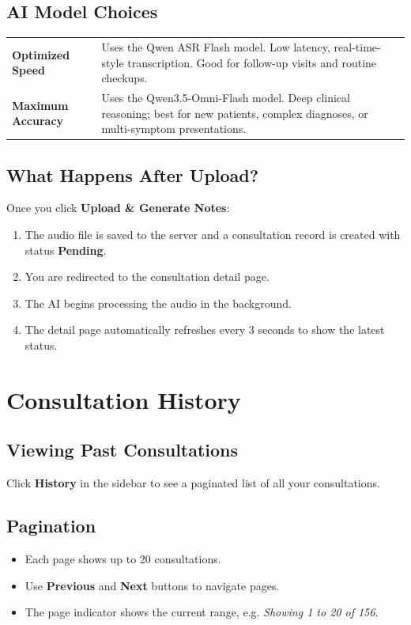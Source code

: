 \documentclass[12pt,a4paper]{article}
\begin{document}
\subsection{AI Model Choices}
\begin{tabular}{m{4cm}m{8cm}}
	\textbf{Optimized Speed}  & Uses the Qwen ASR Flash model. Low latency, real-time-style transcription. Good for follow-up visits and routine checkups.            \\[0.5em]
	\textbf{Maximum Accuracy} & Uses the Qwen3.5-Omni-Flash model. Deep clinical reasoning; best for new patients, complex diagnoses, or multi-symptom presentations. \\
\end{tabular}

\subsection{What Happens After Upload?}
Once you click \textbf{Upload \& Generate Notes}:
\begin{enumerate}
	\item The audio file is saved to the server and a consultation record is created with status \textbf{Pending}.
	\item You are redirected to the consultation detail page.
	\item The AI begins processing the audio in the background.
	\item The detail page automatically refreshes every 3 seconds to show the latest status.
\end{enumerate}

\section{Consultation History}

\subsection{Viewing Past Consultations}
Click \textbf{History} in the sidebar to see a paginated list of all your consultations.

\subsection{Pagination}
\begin{itemize}
	\item Each page shows up to 20 consultations.
	\item Use \textbf{Previous} and \textbf{Next} buttons to navigate pages.
	\item The page indicator shows the current range, e.g. \textit{Showing 1 to 20 of 156}.
\end{itemize}
\end{document}
